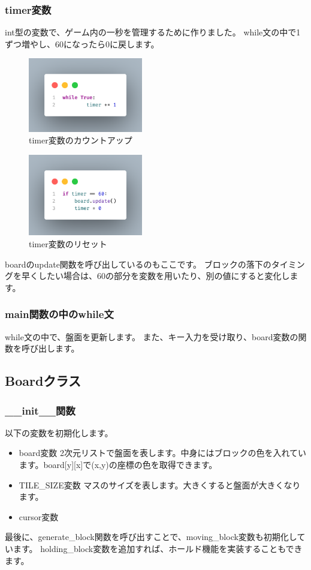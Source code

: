 \subsubsection{timer変数}
int型の変数で、ゲーム内の一秒を管理するために作りました。
while文の中で1ずつ増やし、60になったら0に戻します。
\begin{figure}
  [h]
  \centering
  \includegraphics[width=50mm]{images/timerVar.png}
  \caption{timer変数のカウントアップ}
\end{figure}
\begin{figure}
  [h]
  \centering
  \includegraphics[width=50mm]{images/timerReset.png}
  \caption{timer変数のリセット}
\end{figure}
boardのupdate関数を呼び出しているのもここです。
ブロックの落下のタイミングを早くしたい場合は、60の部分を変数を用いたり、別の値にすると変化します。
\subsubsection{main関数の中のwhile文}
while文の中で、盤面を更新します。
また、キー入力を受け取り、board変数の関数を呼び出します。

\subsection{Boardクラス}
\subsubsection{\_\_init\_\_関数}
以下の変数を初期化します。
\begin{itemize}
  \item board変数 \newline 2次元リストで盤面を表します。中身にはブロックの色を入れています。board[y][x]で(x,y)の座標の色を取得できます。
  \item TILE\_SIZE変数 \newline マスのサイズを表します。大きくすると盤面が大きくなります。
  \item cursor変数
\end{itemize}
最後に、generate\_block関数を呼び出すことで、moving\_block変数も初期化しています。
holding\_block変数を追加すれば、ホールド機能を実装することもできます。
